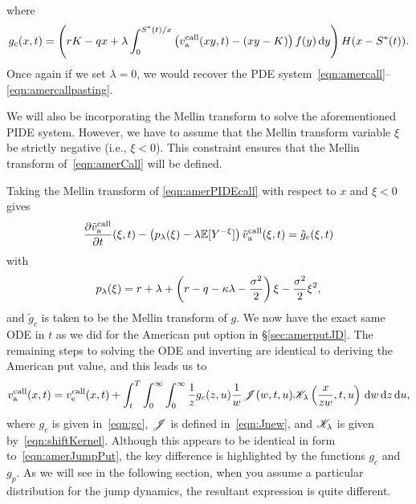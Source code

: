     where
      \begin{equation}
        \label{eqn:gc}
        g_c(x,t) = \left(rK - qx + \lambda \int_0^{S^*(t)/x} \left(v_{\text{a}}^{\text{call}}(xy,t) - (xy-K)\right)f(y) \,\mathrm d y \right)H(x-S^*(t)).
      \end{equation}
Once again if we set $\lambda = 0$, we would recover the PDE system~\eqref{eqn:amercall}--\eqref{eqn:amercallpasting}. 

We will also be incorporating the Mellin transform to solve the aforementioned PIDE system. However, we have to assume that the Mellin transform variable $\xi$ be strictly negative (i.e., $\xi < 0$). This constraint ensures that the Mellin transform of~\eqref{eqn:amerCall} will be defined.
		
Taking the Mellin transform of \eqref{eqn:amerPIDEcall} with respect to $x$ and $\xi < 0$ gives
      \begin{equation}
      	  \label{eqn:PIDEODEamerCall}
        \frac{\partial \tilde{ v}_{\text{a}}^{\text{call}}}{\partial t}(\xi,t) - \left(p_\lambda(\xi) - \lambda\mathbb E[Y^{-\xi}]\right)\tilde{ v}_{\text{a}}^{\text{call}}(\xi,t) = \tilde{g}_c(\xi,t)
      \end{equation}
    with
      \begin{equation*}
        p_\lambda(\xi) = r + \lambda + \left(r - q -\kappa\lambda - \frac{\sigma^2}{2}\right)\xi - \frac{\sigma^2}{2}\xi^2,
      \end{equation*}
    and $\tilde g_c$ is taken to be the Mellin transform of $g$. We now have the exact same ODE in $t$ as we did for the American put option in \S\ref{sec:amerputJD}. The remaining steps to solving the ODE and inverting are identical to deriving the American put value, and this leads us to
        	\begin{equation}
        		\label{eqn:amerJumpCall}
        		v_{\text{a}}^{\text{call}}(x,t) = v_{\text{e}}^{\text{call}}(x,t) + \int_t^T \int_0^\infty \int_0^\infty \frac{1}{z}g_c(z,u) \frac{1}{w}\mathscr J(w,t,u)\mathscr K_\lambda\left(\frac{x}{zw},t,u\right) \, \mathrm d w \, \mathrm d z \, \mathrm d u,
        	\end{equation}
	where $g_c$ is given in~\eqref{eqn:gc}, $\mathscr J$ is defined in~\eqref{eqn:Jnew}, and $\mathscr K_\lambda$ is given by~\eqref{eqn:shiftKernel}. Although this appears to be identical in form to~\eqref{eqn:amerJumpPut}, the key difference is highlighted by the functions $g_c$ and $g_p$. As we will see in the following section, when you assume a particular distribution for the jump dynamics, the resultant expression is quite different.
      
